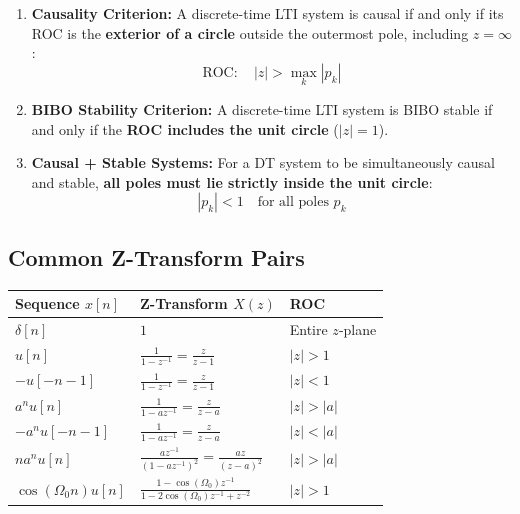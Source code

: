 \documentclass[12pt,a4paper]{article}
\renewcommand{\arraystretch}{1.45}
\begin{document}
\begin{tcolorbox}[formulabox, title={\textbf{Causality and BIBO Stability Criteria in the \texorpdfstring{$z$}{z}-Plane}}]
\begin{enumerate}[topsep=2pt, itemsep=3pt]
  \item \textbf{Causality Criterion:} A discrete-time LTI system is causal if and only if its ROC is the \textbf{exterior of a circle} outside the outermost pole, including $z = \infty$:
  \begin{equation}
    \text{ROC}: \quad |z| > \max_k |p_k|
  \end{equation}
  \item \textbf{BIBO Stability Criterion:} A discrete-time LTI system is BIBO stable if and only if the \textbf{ROC includes the unit circle} ($|z| = 1$).
  \item \textbf{Causal + Stable Systems:} For a DT system to be simultaneously causal and stable, \textbf{all poles must lie strictly inside the unit circle}:
  \begin{equation}
    |p_k| < 1 \quad \text{for all poles } p_k
  \end{equation}
\end{enumerate}
\end{tcolorbox}

\subsection{Common Z-Transform Pairs}

\par\vspace{6pt}\noindent
\begingroup
\setlength{\tabcolsep}{5pt}
\setlength{\extrarowheight}{3pt}
\renewcommand{\arraystretch}{1.4}
\begin{tabularx}{\linewidth}{|B{3.8cm}|B{4.5cm}|Y|}
\hline
\textbf{Sequence $x[n]$} & \textbf{Z-Transform $X(z)$} & \textbf{ROC} \\
\hline
$\delta[n]$ & $1$ & Entire $z$-plane \\
\hline
$u[n]$ & $\frac{1}{1 - z^{-1}} = \frac{z}{z - 1}$ & $|z| > 1$ \\
\hline
$-u[-n-1]$ & $\frac{1}{1 - z^{-1}} = \frac{z}{z - 1}$ & $|z| < 1$ \\
\hline
$a^n u[n]$ & $\frac{1}{1 - a z^{-1}} = \frac{z}{z - a}$ & $|z| > |a|$ \\
\hline
$-a^n u[-n-1]$ & $\frac{1}{1 - a z^{-1}} = \frac{z}{z - a}$ & $|z| < |a|$ \\
\hline
$n a^n u[n]$ & $\frac{a z^{-1}}{(1 - a z^{-1})^2} = \frac{a z}{(z - a)^2}$ & $|z| > |a|$ \\
\hline
$\cos(\Omega_0 n) u[n]$ & $\frac{1 - \cos(\Omega_0) z^{-1}}{1 - 2\cos(\Omega_0) z^{-1} + z^{-2}}$ & $|z| > 1$ \\
\hline
\end{tabularx}
\endgroup
\end{document}

